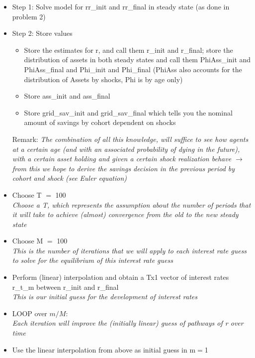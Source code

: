 \documentclass[12pt,a4paper]{article}
\begin{document}
\begin{itemize}
    \item Step 1: Solve model for rr\_init and rr\_final in steady state (as done in problem 2) 
    \item Step 2: Store values
    \begin{itemize}
    \item Store the estimates for r, and call them r\_init and r\_final;
    store the distribution of assets in both steady states and call them PhiAss\_init and PhiAss\_final and Phi\_init and Phi\_final (PhiAss also accounts for the distribution of Assets by shocks, Phi is by age only) 
    \item Store ass\_init and ass\_final
    \item Store grid\_sav\_init and grid\_sav\_final which tells you the nominal amount of savings by cohort dependent on shocks
    \end{itemize}
Remark: \textit{The combination of all this knowledge, will suffice to see how agents at a certain age (and with an associated probability of dying in the future), with a certain asset holding and given a certain shock realization behave $\rightarrow$ from this we hope to derive the savings decision in the previous period by cohort and shock (see Euler equation)}

\item Choose T $=$ 100 \\
\textit{Choose a T, which represents the assumption about the number of periods that it will take to achieve (almost) convergence from the old to the new steady state}

\item Choose M $=$ 100 \\
\textit{This is the number of iterations that we will apply to each interest rate guess to solve for the equilibrium of this interest rate guess}

\item Perform (linear) interpolation and obtain a Tx1 vector of interest rates r\_t\_m between r\_init and r\_final\\
\textit{This is our initial guess for the development of interest rates}

\item	LOOP over $m/M$: \\
\textit{Each iteration will improve the (initially linear) guess of pathways of r over time}
\item Use the linear interpolation from above as initial guess in m$=$1


\end{itemize}
\end{document}
